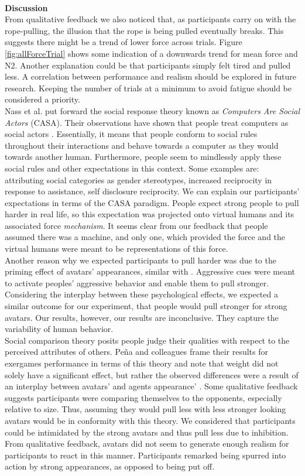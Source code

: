 \\
\textbf{Discussion}\\
 From qualitative feedback we also noticed that, as participants carry on with the rope-pulling, the illusion that the rope is being pulled eventually breaks. This suggests there might be a trend of lower force across trials. Figure \ref{fig:allForceTrial} shows some indication of a downwards trend for mean force and N2. Another explanation could be that participants simply felt tired and pulled less. A correlation between performance and realism should be explored in future research. Keeping the number of trials at a minimum to avoid fatigue should be considered a priority. 
\\
Nass et al. put forward the social response theory  known as \textit{Computers Are Social Actors} (CASA). Their observations have shown that people treat computers as social actors \cite{nass1994computers}. Essentially, it means that people conform to social rules throughout their interactions and behave towards a computer as they would towards another human. Furthermore, people seem to mindlessly apply these social rules and other expectations in this context. Some examples are: attributing social categories as gender stereotypes, increased reciprocity in response to assistance,  self disclosure reciprocity. We can explain our participants' expectations in terms of the CASA paradigm. People expect strong people to pull harder in real life, so this expectation was projected onto virtual humans and its associated force \textit{mechanism}. It seems clear from our feedback that people assumed there was a machine, and only one, which provided the force and the virtual humans were meant to be representations of this force. 
\\
Another reason why we expected participants to pull harder was due to the priming effect of avatars' appearances, similar with \cite{pena2009priming}. Aggressive cues were meant to activate peoples' aggressive behavior and enable them to pull stronger. Considering the interplay between these psychological effects, we expected a similar outcome for our experiment, that people would pull stronger for strong avatars. Our results, however, our results are inconclusive. They capture the variability of human behavior.
\\
Social comparison theory posits people judge their qualities with respect to the perceived attributes of others. Peña and colleagues  frame their results for exergames performance in terms of this theory and note that weight did not solely have a significant effect, but rather the observed differences were a result of an interplay between avatars' and agents appearance' \cite{pena2016see}. Some qualitative feedback suggests participants were comparing themselves to the opponents, especially relative to size. Thus, assuming they would pull less with less stronger looking avatars would be in conformity with this theory.  We considered that participants could be intimidated by the strong avatars and thus pull less due to inhibition. From qualitative feedback, avatars did not seem to generate enough realism for participants to react in this manner. Participants remarked being spurred into action by strong appearances, as opposed to being put off.
